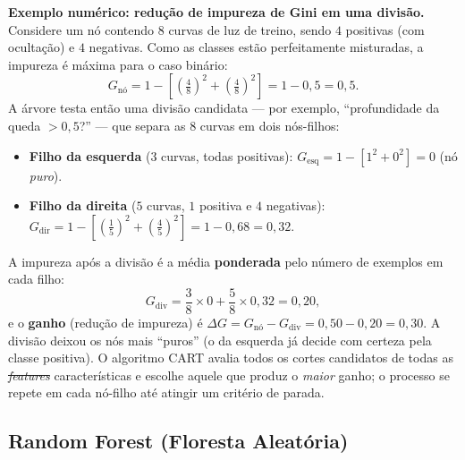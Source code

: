 \documentclass[msc]{on} %
\makeatletter
\providecommand{\DIFaddtex}[1]{{\protect\color{red}#1}} %
\providecommand{\DIFdeltex}[1]{{\protect\color{red}\sout{#1}}} %
\providecommand{\DIFaddbegin}{} %
\providecommand{\DIFaddend}{} %
\providecommand{\DIFdelbegin}{} %
\providecommand{\DIFdelend}{} %
\providecommand{\DIFadd}[1]{\texorpdfstring{\DIFaddtex{#1}}{#1}} %
\providecommand{\DIFdel}[1]{\texorpdfstring{\DIFdeltex{#1}}{}} %
\let\sout@orig\sout %
\renewcommand{\sout}[1]{\ifmmode\text{\sout@orig{\ensuremath{#1}}}\else\sout@orig{#1}\fi} %
\makeatother
\begin{document}
\vspace{0.3cm}
\noindent\textbf{Exemplo numérico: redução de impureza de Gini em uma divisão.}
Considere um nó contendo $8$ curvas de luz de treino, sendo $4$ positivas (com ocultação) e $4$ negativas. Como as classes estão perfeitamente misturadas, a impureza é máxima para o caso binário:
\[
G_{\text{nó}} = 1 - \left[\left(\tfrac{4}{8}\right)^2 + \left(\tfrac{4}{8}\right)^2\right] = 1 - 0{,}5 = 0{,}5.
\]
A árvore testa então uma divisão candidata --- por exemplo, ``profundidade da queda $> 0{,}5$?'' --- que separa as $8$ curvas em dois nós-filhos:
\begin{itemize}
	\item \textbf{Filho da esquerda} ($3$ curvas, todas positivas): $G_{\text{esq}} = 1 - \left[1^2 + 0^2\right] = 0$ (nó \emph{puro}).
	\item \textbf{Filho da direita} ($5$ curvas, $1$ positiva e $4$ negativas): $G_{\text{dir}} = 1 - \left[\left(\tfrac{1}{5}\right)^2 + \left(\tfrac{4}{5}\right)^2\right] = 1 - 0{,}68 = 0{,}32$.
\end{itemize}
A impureza após a divisão é a média \textbf{ponderada} pelo número de exemplos em cada filho:
\[
G_{\text{div}} = \frac{3}{8}\times 0 + \frac{5}{8}\times 0{,}32 = 0{,}20,
\]
e o \textbf{ganho} (redução de impureza) é $\Delta G = G_{\text{nó}} - G_{\text{div}} = 0{,}50 - 0{,}20 = 0{,}30$. A divisão deixou os nós mais ``puros'' (o da esquerda já decide com certeza pela classe positiva). O algoritmo CART avalia todos os cortes candidatos de todas as \DIFdelbegin \textit{\DIFdel{features}} %
\DIFdelend\ifhmode\hskip0pt\fi \DIFaddbegin \DIFadd{características }\DIFaddend e escolhe aquele que produz o \emph{maior} ganho; o processo se repete em cada nó-filho até atingir um critério de parada.
\vspace{0.3cm}

\subsection{Random Forest (Floresta Aleatória)}
\end{document}
